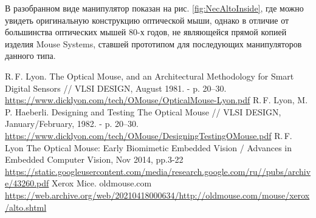 \documentclass[11pt, a4paper]{article}
\begin{document}
В разобранном виде манипулятор показан на рис. \ref{fig:NecAltoInside}, где можно увидеть оригинальную конструкцию оптической мыши, однако в отличие от большинства оптических мышей 80-х годов, не являющейся прямой копией изделия Mouse Systems, ставшей прототипом для последующих манипуляторов данного типа.
    
\begin{thebibliography}{9}
 R.\,F. Lyon. The Optical Mouse, and an Architectural Methodology for
Smart Digital Sensors // VLSI DESIGN, August 1981. - p. 20--30. \url{https://www.dicklyon.com/tech/OMouse/OpticalMouse-Lyon.pdf}
 R.\,F. Lyon, M.\,P. Haeberli. Designing and Testing The Optical Mouse // VLSI DESIGN, January/February, 1982. - p. 20--30. \url{https://www.dicklyon.com/tech/OMouse/DesigningTestingOMouse.pdf}
 R.\,F. Lyon The Optical Mouse: Early Biomimetic Embedded Vision / Advances in Embedded Computer Vision, Nov 2014, pp.3-22 \url{https://static.googleusercontent.com/media/research.google.com/ru//pubs/archive/43260.pdf}
 Xerox Mice. oldmouse.com \url{https://web.archive.org/web/20210418000634/http://oldmouse.com/mouse/xerox/alto.shtml}
\end{thebibliography}
\end{document}
